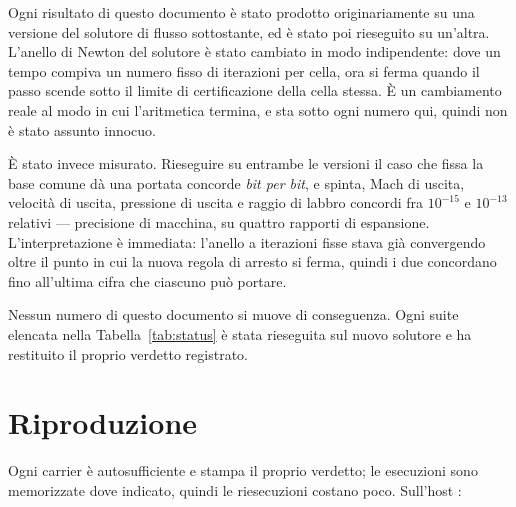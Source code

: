 Ogni risultato di questo documento è stato prodotto originariamente su
una versione del solutore di flusso sottostante, ed è stato poi
rieseguito su un'altra. L'anello di Newton del solutore è stato
cambiato in modo indipendente: dove un tempo compiva un numero fisso
di iterazioni per cella, ora si ferma quando il passo scende sotto il
limite di certificazione della cella stessa. È un cambiamento reale al
modo in cui l'aritmetica termina, e sta sotto ogni numero qui, quindi
non è stato assunto innocuo.

È stato invece misurato. Rieseguire su entrambe le versioni il caso
che fissa la base comune dà una portata concorde \emph{bit per bit}, e
spinta, Mach di uscita, velocità di uscita, pressione di uscita e
raggio di labbro concordi fra $10^{-15}$ e $10^{-13}$ relativi ---
precisione di macchina, su quattro rapporti di espansione.
L'interpretazione è immediata: l'anello a iterazioni fisse stava già
convergendo oltre il punto in cui la nuova regola di arresto si ferma,
quindi i due concordano fino all'ultima cifra che ciascuno può
portare.

Nessun numero di questo documento si muove di conseguenza. Ogni suite
elencata nella Tabella~\ref{tab:status} è stata rieseguita sul nuovo
solutore e ha restituito il proprio verdetto registrato.

\section{Riproduzione}

Ogni carrier è autosufficiente e stampa il proprio verdetto; le
esecuzioni sono memorizzate dove indicato, quindi le riesecuzioni
costano poco. Sull'host :

